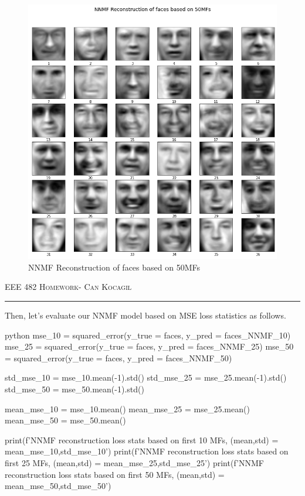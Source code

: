 \documentclass[12pt]{amsart}
\begin{document}
\begin{figure}[h]
    \centering
        \includegraphics[width = 1\textwidth]{images/Q1/NNMF Reconstruction of faces based on 50MFs.png}
        \caption{NNMF Reconstruction of faces based on 50MFs}
\end{figure}


\newpage
{\scshape EEE 482} \hfill {\scshape \large  Homework-\relax} \hfill {\scshape Can Kocagil}
\smallskip
\hrule
\vspace{2mm}


Then, let's evaluate our NNMF model based on MSE loss statistics as follows.

\begin{mintedbox}{python}
mse_10 = squared_error(y_true = faces, y_pred = faces_NNMF_10)
mse_25 = squared_error(y_true = faces, y_pred = faces_NNMF_25)
mse_50 = squared_error(y_true = faces, y_pred = faces_NNMF_50)


std_mse_10 = mse_10.mean(-1).std()
std_mse_25 = mse_25.mean(-1).std()
std_mse_50 = mse_50.mean(-1).std()

mean_mse_10 = mse_10.mean()
mean_mse_25 = mse_25.mean()
mean_mse_50 = mse_50.mean()


print(f'NNMF reconstruction loss stats based on first 10 MFs, \n (mean,std) = {mean_mse_10,std_mse_10}')
print(f'NNMF reconstruction loss stats based on first 25 MFs, \n (mean,std) = {mean_mse_25,std_mse_25}')
print(f'NNMF reconstruction loss stats based on first 50 MFs, \n (mean,std) = {mean_mse_50,std_mse_50}')
\end{mintedbox}
\end{document}

